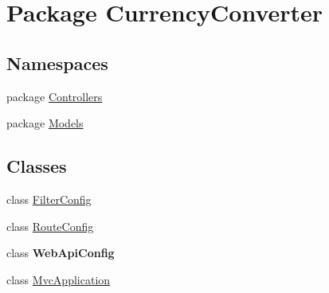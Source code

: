 \hypertarget{namespace_currency_converter}{\section{Package Currency\-Converter}
\label{namespace_currency_converter}
}
\subsection*{Namespaces}
\begin{DoxyCompactItemize}
\item 
package \hyperlink{namespace_currency_converter_1_1_controllers}{Controllers}
\item 
package \hyperlink{namespace_currency_converter_1_1_models}{Models}
\end{DoxyCompactItemize}
\subsection*{Classes}
\begin{DoxyCompactItemize}
\item 
class \hyperlink{class_currency_converter_1_1_filter_config}{Filter\-Config}
\item 
class \hyperlink{class_currency_converter_1_1_route_config}{Route\-Config}
\item 
class {\bfseries Web\-Api\-Config}
\item 
class \hyperlink{class_currency_converter_1_1_mvc_application}{Mvc\-Application}
\end{DoxyCompactItemize}
